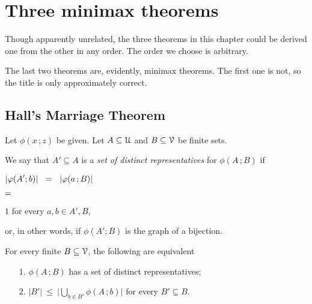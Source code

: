 \documentclass[scombinatorics.tex]{subfiles}
\begin{document}
\chapter{Three minimax theorems}
\label{minimax}

\def\medrel#1{\parbox[t]{6ex}{$\displaystyle\hfil #1$}}
\def\ceq#1#2#3{\parbox[t]{30ex}{$\displaystyle #1$}\medrel{#2}{$\displaystyle #3$}}

\def\separatore{\hfil o \rule[0.5ex]{4ex}{0.1ex} o \rule[0.5ex]{4ex}{0.1ex} o}

Though apparently unrelated, the three theorems in this chapter could be derived one from the other in any order.
The order we choose is arbitrary.

The last two theorems are, evidently, minimax theorems.
The first one is not, so the title is only approximately correct. 


\section{Hall's Marriage Theorem}\label{marriage}

\def\ceq#1#2#3{\parbox[t]{30ex}{$\displaystyle #1$}\medrel{#2}{$\displaystyle #3$}}

Let $\phi(x\,;z)$ be given. 
Let $A\subseteq\EuScript U$ and $B\subseteq\EuScript V$ be finite sets. 

We say that $A'\subseteq A$ is a \emph{set of distinct representatives\/} for $\phi(A\,;B)$ if

\ceq{\hfill|\phi(A';b)|\medrel{=}|\phi(a\,;B)|}
{=}
{1}
\quad for every $a,b\in A',B$,

or, in other words, if $\phi(A';B)$ is the graph of a bijection.

\begin{void_thm}\label{thm_marriage}
  For every finite $B\subseteq\EuScript V$, the following are equivalent
  \begin{itemize}
    \item[1.] $\phi(A\,;B)$ has a set of distinct representatives;

    \item[2.] $\displaystyle|B'|\ \le\ \bigg|\bigcup_{b\in B'}\phi(A\,;b)\bigg|$ for every $B'\subseteq B$.
  \end{itemize}
\end{void_thm}
\end{document}
